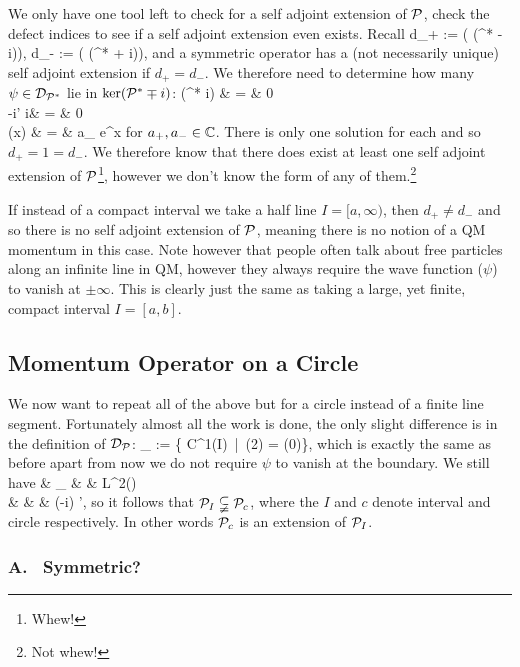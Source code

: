 We only have one tool left to check for a self adjoint extension of $\mathcal{P}$, check the defect indices to see if a self adjoint extension even exists. Recall 
\bse
d_+ := \dim\big( \ker(\cP^* - i)\big), \qquad d_- := \dim\big( \ker(\cP^* + i)\big),
\ese 
and a symmetric operator has a (not necessarily unique) self adjoint extension if $d_+ = d_-$. We therefore need to determine how many $\psi\in\mathcal{D}_{\mathcal{P}^*}$ lie in $\ker(\mathcal{P}^*\mp i)$:
(\cP^* \mp i) \psi & = & 0 \\
-i\psi' \mp i\psi & = & 0 \\
\psi(x) & = & a_{\pm} e^{\mp x}
\ei 
for $a_+, a_- \in \mathbb{C}$. There is only one solution for each and so $d_+ = 1 = d_-$. We therefore know that there does exist at least one self adjoint extension of $\mathcal{P}$\footnote{Whew!}, however we don't know the form of any of them.\footnote{Not whew!}

\br 
If instead of a compact interval we take a half line $I = [a,\infty)$, then $d_+ \neq d_-$ and so there is no self adjoint extension of $\mathcal{P}$, meaning there is no notion of a QM momentum in this case. Note however that people often talk about free particles along an infinite line in QM, however they always require the wave function ($\psi$) to vanish at $\pm \infty$. This is clearly just the same as taking a large, yet finite, compact interval $I=[a,b]$. 
\er 

\subsection{Momentum Operator on a Circle}

We now want to repeat all of the above but for a circle instead of a finite line segment. Fortunately almost all the work is done, the only slight difference is in the definition of $\mathcal{D}_{\mathcal{P}}$: 
\bse 
\cD_{\cP} := \{ \psi \in C^1(I) \,|\, \psi(2\pi) = \psi(0)\},
\ese 
which is exactly the same as before apart from now we do not require $\psi$ to vanish at the boundary. We still have 
\cP \cl & \cD_{\cP} & \to & L^2(\R)\\
& \psi & \mapsto & (-i) \psi',
\ei
so it follows that $\mathcal{P}_I \subsetneqq \mathcal{P}_c$, where the $I$ and $c$ denote interval and circle respectively. In other words $\mathcal{P}_c$ is an extension of $\mathcal{P}_I$.

\subsubsection*{A. \ Symmetric?}

